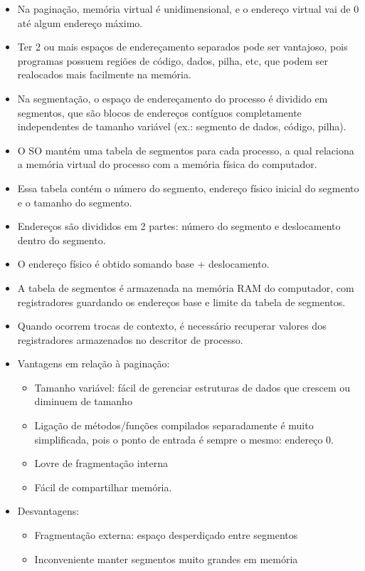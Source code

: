 \documentclass[10pt]{article}
\begin{document}
\begin{itemize}
    \item Na paginação, memória virtual é unidimensional, e o endereço virtual vai de 
        0 até algum endereço máximo.
    \item Ter 2 ou mais espaços de endereçamento separados pode ser vantajoso, pois
        programas possuem regiões de código, dados, pilha, etc, que podem ser realocados
        mais facilmente na memória.
    \item Na segmentação, o espaço de endereçamento do processo é dividido em segmentos,
        que são blocos de endereços contíguos completamente independentes de tamanho 
        variável (ex.: segmento de dados, código, pilha).
    \item O SO mantém uma tabela de segmentos para cada processo, a qual relaciona a 
        memória virtual do processo com a memória física do computador. 
    \item Essa tabela contém o número do segmento, endereço físico inicial do segmento
        e o tamanho do segmento.
    \item Endereços são divididos em 2 partes: número do segmento e deslocamento
        dentro do segmento.
    \item O endereço físico é obtido somando base + deslocamento.
    \item A tabela de segmentos é armazenada na memória RAM do computador, com 
        registradores guardando os endereços base e limite da tabela de segmentos.
    \item Quando ocorrem trocas de contexto, é necessário recuperar valores dos registradores
        armazenados no descritor de processo.
    \item Vantagens em relação à paginação:
        \begin{itemize}
            \item Tamanho variável: fácil de gerenciar estruturas de dados que crescem
                ou diminuem de tamanho
            \item Ligação de métodos/funções compilados separadamente é muito simplificada,
                pois o ponto de entrada é sempre o mesmo: endereço 0.
            \item Lovre de fragmentação interna
            \item Fácil de compartilhar memória.
        \end{itemize}
    \item Desvantagens:
    \begin{itemize}
        \item Fragmentação externa: espaço desperdiçado entre segmentos
        \item Inconveniente manter segmentos muito grandes em memória
    \end{itemize}
\end{itemize}
\end{document}
